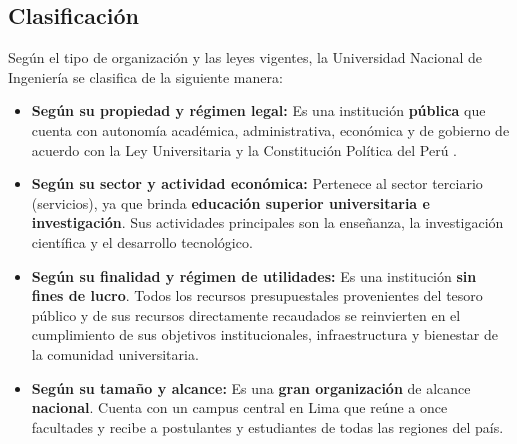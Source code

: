 \subsection{Clasificación}

Según el tipo de organización y las leyes vigentes, la Universidad Nacional de Ingeniería se clasifica de la siguiente manera:

\begin{itemize}
    \item \textbf{Según su propiedad y régimen legal:} Es una institución \textbf{pública} que cuenta con autonomía académica, administrativa, económica y de gobierno de acuerdo con la Ley Universitaria y la Constitución Política del Perú \cite{ley30220}.
    
    \item \textbf{Según su sector y actividad económica:} Pertenece al sector terciario (servicios), ya que brinda \textbf{educación superior universitaria e investigación}. Sus actividades principales son la enseñanza, la investigación científica y el desarrollo tecnológico.
    
    \item \textbf{Según su finalidad y régimen de utilidades:} Es una institución \textbf{sin fines de lucro}. Todos los recursos presupuestales provenientes del tesoro público y de sus recursos directamente recaudados se reinvierten en el cumplimiento de sus objetivos institucionales, infraestructura y bienestar de la comunidad universitaria.
    
    \item \textbf{Según su tamaño y alcance:} Es una \textbf{gran organización} de alcance \textbf{nacional}. Cuenta con un campus central en Lima que reúne a once facultades y recibe a postulantes y estudiantes de todas las regiones del país.
\end{itemize}
